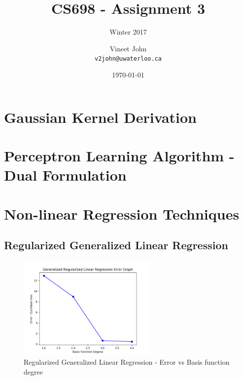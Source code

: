 \documentclass[parskip=full]{scrartcl}
\begin{document}
\title{CS698 - Assignment 3}
\subtitle{Winter 2017}
\author{
    Vineet John\\
    \texttt{v2john@uwaterloo.ca}
}
\date{\today}
\maketitle


\section{Gaussian Kernel Derivation} %
\label{sec:gaussian_kernel_derivation}





\section{Perceptron Learning Algorithm - Dual Formulation} %
\label{sec:perceptron_learning_algorithm_dual_formulation}





\section{Non-linear Regression Techniques} %
\label{sec:non_linear_regression_techniques}

    \subsection{Regularized Generalized Linear Regression} %
    \label{sub:regularized_generalized_linear_regression}
    
        \begin{figure}[ht]
            \centering
            \includegraphics[width=0.6\textwidth]{3a_degree_vs_error.png}
            \caption{Regularized Generalized Linear Regression - Error vs Basis function degree}
            \label{fig:rglg_err_v_deg}
        \end{figure}
\end{document}
